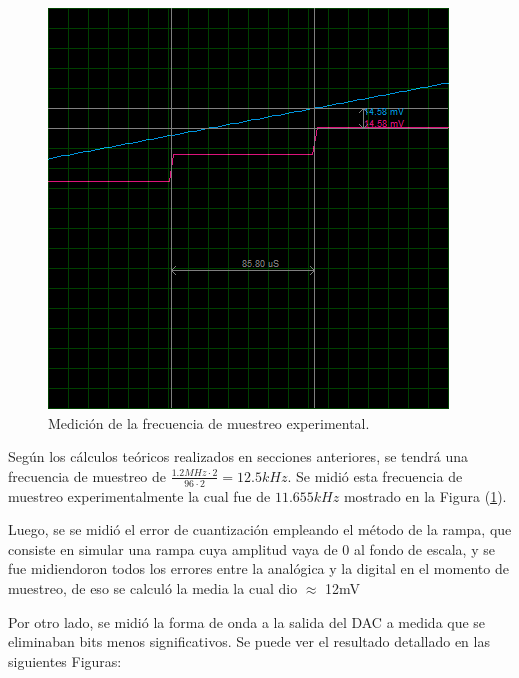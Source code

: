 \begin{figure}[H]
\centering
\includegraphics[width=0.8\linewidth]{ImagenesEjercicio1/rampa1zoom.png}
\caption{Medición de la frecuencia de muestreo experimental.}
\label{med2}
\end{figure}
Según los cálculos teóricos realizados en secciones anteriores, se tendrá una frecuencia de muestreo de $\frac{1.2MHz \cdot 2}{96 \cdot 2} = 12.5kHz$. Se midió esta frecuencia de muestreo experimentalmente la cual fue de $11.655kHz$ mostrado en la Figura (\ref{med2}).


Luego, se se midió el error de cuantización empleando el método de la rampa, que consiste en simular una rampa cuya amplitud vaya de 0 al fondo de escala, y se fue midiendoron todos los errores entre la analógica y la digital en el momento de muestreo, de eso se calculó la media la cual dio $\approx$ 12mV

Por otro lado, se midió la forma de onda a la salida del DAC a medida que se eliminaban bits menos significativos. Se puede ver el resultado detallado en las siguientes Figuras:

\newpage

